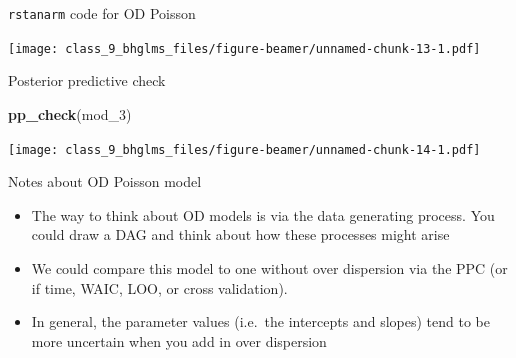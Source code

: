 \documentclass[ignorenonframetext,]{beamer}
\newenvironment{Shaded}{\begin{snugshade}}{\end{snugshade}}
\newcommand{\KeywordTok}[1]{\textcolor[rgb]{0.13,0.29,0.53}{\textbf{#1}}}
\newcommand{\DataTypeTok}[1]{\textcolor[rgb]{0.13,0.29,0.53}{#1}}
\newcommand{\DecValTok}[1]{\textcolor[rgb]{0.00,0.00,0.81}{#1}}
\newcommand{\StringTok}[1]{\textcolor[rgb]{0.31,0.60,0.02}{#1}}
\newcommand{\OperatorTok}[1]{\textcolor[rgb]{0.81,0.36,0.00}{\textbf{#1}}}
\newcommand{\NormalTok}[1]{#1}
\begin{document}
\begin{frame}[fragile]{\texttt{rstanarm} code for OD Poisson}

\begin{Shaded}
\end{Shaded}

\texttt{[image: class\_9\_bhglms\_files/figure-beamer/unnamed-chunk-13-1.pdf]}

\end{frame}

\begin{frame}[fragile]{Posterior predictive check}

\begin{Shaded}
\begin{Highlighting}[]
\KeywordTok{pp_check}\NormalTok{(mod_}\DecValTok{3}\NormalTok{)}
\end{Highlighting}
\end{Shaded}

\texttt{[image: class\_9\_bhglms\_files/figure-beamer/unnamed-chunk-14-1.pdf]}

\end{frame}

\begin{frame}{Notes about OD Poisson model}

\begin{itemize}
\item
  The way to think about OD models is via the data generating process.
  You could draw a DAG and think about how these processes might arise
\item
  We could compare this model to one without over dispersion via the PPC
  (or if time, WAIC, LOO, or cross validation).
\item
  In general, the parameter values (i.e.~the intercepts and slopes) tend
  to be more uncertain when you add in over dispersion
\end{itemize}

\end{frame}
\end{document}
